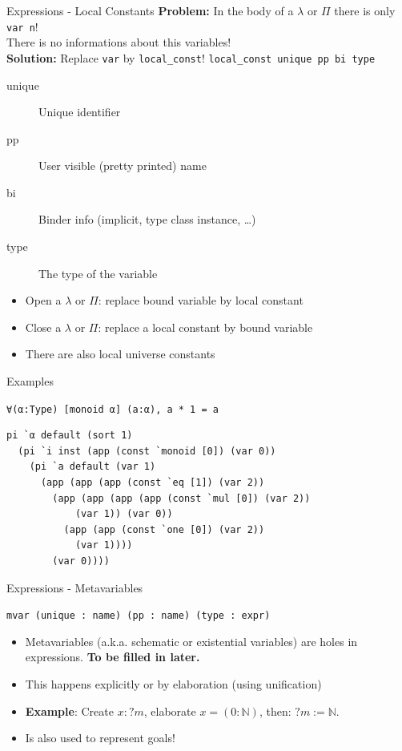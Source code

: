 \documentclass[usenames,dvipsnames]{beamer}
\begin{document}
\begin{frame}[fragile]{Expressions - Local Constants}
  \textbf{Problem:} In the body of a $\lambda$ or $\Pi$ there is only \verb|var n|! \\
  \quad There is no informations about this variables! \\[1ex]

  \textbf{Solution:} Replace \lstinline{var} by \lstinline{local_const}!
  \lstinline{local_const unique pp bi type}
  \begin{description}
    \item[unique] Unique identifier
    \item[pp] User visible (pretty printed) name
    \item[bi] Binder info (implicit, type class instance, \ldots)
    \item[type] The type of the variable
  \end{description}

  \begin{itemize}
    \item Open a $\lambda$ or $\Pi$: replace bound variable by local constant
    \item Close a $\lambda$ or $\Pi$: replace a local constant by bound variable
    \item There are also local universe constants
  \end{itemize}

\end{frame}

\begin{frame}[fragile]{Examples}

\lstinline{∀(α:Type) [monoid α] (a:α), a * 1 = a}

\begin{lstlisting}
pi `α default (sort 1)
  (pi `i inst (app (const `monoid [0]) (var 0))
    (pi `a default (var 1)
      (app (app (app (const `eq [1]) (var 2))
        (app (app (app (app (const `mul [0]) (var 2))
            (var 1)) (var 0))
          (app (app (const `one [0]) (var 2))
            (var 1))))
        (var 0))))
\end{lstlisting}
\end{frame}


\begin{frame}[fragile]{Expressions - Metavariables}

\lstinline$mvar (unique : name) (pp : name) (type : expr)$

\begin{itemize}
\item Metavariables (a.k.a. schematic or existential variables) are holes in expressions.
   \textbf{To be filled in later.}
\item This happens explicitly or by elaboration (using unification)
\item \textbf{Example}:
  Create $x : ?m$, elaborate $x = (0 : \mathbb{N})$, then: $?m := \mathbb{N}$.
\item Is also used to represent goals!
\end{itemize}

\end{frame}
\end{document}

